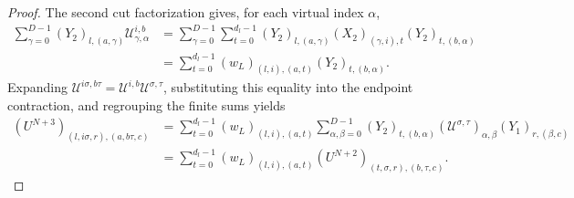 \begin{proof}\leanok
    The second cut factorization gives, for each virtual index $\alpha$,
    \begin{align}
        \sum_{\gamma=0}^{D-1}(Y_2)_{l,(a,\gamma)}
        \mathcal U^{i,b}_{\gamma,\alpha}
         & =\sum_{\gamma=0}^{D-1}\sum_{t=0}^{d_l-1}
        (Y_2)_{l,(a,\gamma)}(X_2)_{(\gamma,i),t}
        (Y_2)_{t,(b,\alpha)}                                           \\
         & =\sum_{t=0}^{d_l-1}(w_L)_{(l,i),(a,t)}(Y_2)_{t,(b,\alpha)}.
    \end{align}
    Expanding $\mathcal U^{i\sigma,b\tau}
        =\mathcal U^{i,b}\mathcal U^{\sigma,\tau}$, substituting this equality
    into the endpoint contraction, and regrouping the finite sums yields
    \begin{align}
        (U^{N+3})_{(l,i\sigma,r),(a,b\tau,c)}
         & =\sum_{t=0}^{d_l-1}(w_L)_{(l,i),(a,t)}
        \sum_{\alpha,\beta=0}^{D-1}(Y_2)_{t,(b,\alpha)}
        (\mathcal U^{\sigma,\tau})_{\alpha,\beta}(Y_1)_{r,(\beta,c)} \\
         & =\sum_{t=0}^{d_l-1}(w_L)_{(l,i),(a,t)}
        (U^{N+2})_{(t,\sigma,r),(b,\tau,c)}.
    \end{align}
\end{proof}

